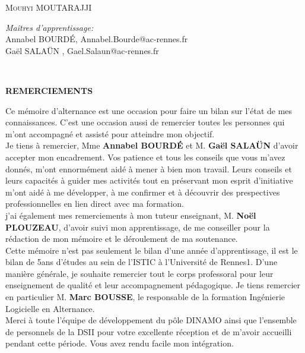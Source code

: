 \documentclass[12pt]{article}
\begin{document}
\begin{titlepage}
	\centering   %
	\textsc{ Mouhyi MOUTARAJJI}\\
		\begin{flushleft} \large
		    \emph{Maîtres d'apprentissage:} \\
		    Annabel BOURDÉ, Annabel.Bourde@ac-rennes.fr\\
			Gaël SALAÜN , Gael.Salaun@ac-rennes.fr\\
			
			
		\end{flushleft}
	
\end{titlepage}


\newpage

\tableofcontents
~
\newpage
\begin{center}
\bfseries {REMERCIEMENTS}
\end{center}


Ce mémoire d'alternance est  une occasion pour faire un bilan sur l'état de mes connaissances. C'est une occasion aussi de remercier toutes les personnes qui m'ont accompagné et assisté pour atteindre mon objectif.\\


Je tiens à remercier, Mme \textbf{Annabel BOURDÉ} et M. \textbf{Gaël SALAÜN} d'avoir accepter mon encadrement. Vos patience et tous les conseils que vous m'avez donnés, m'ont ennormément aidé à mener à bien mon travail. Leurs conseils et leurs capacités à guider mes activités tout en préservant mon esprit d'initiative m'ont aidé à me développer, à me confirmer et à découvrir des prespectives professionnelles en lien direct avec ma formation.\\ 


j'ai également mes remerciements à mon tuteur enseignant, M. \textbf{Noël PLOUZEAU},  d'avoir suivi mon apprentissage, de me conseiller pour la rédaction de mon mémoire et le déroulement de ma soutenance. \\

Cette mémoire n'est pas seulement le bilan d'une année d'apprentissage, il est le bilan de 5ans d'études au sein de l'ISTIC à l'Université de Rennes1. D'une manière générale, je souhaite remercier tout le corps professoral pour leur enseignement de qualité et leur accompagnement pédagogique. Je tiens remercier en particulier M. \textbf{Marc BOUSSE}, le responsable de la formation Ingénierie Logicielle en Alternance. \\

Merci à toute l'équipe de développement du pôle DINAMO ainsi	que l'ensemble de personnels de la DSII pour votre excellente réception et de m'avoir accueilli pendant cette période. Vous avez rendu facile mon intégration. \\
\end{document}
